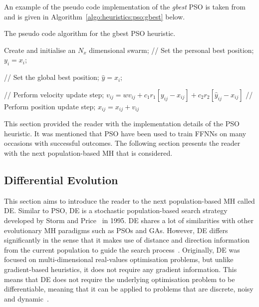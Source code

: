 An example of the pseudo code implementation of the \textit{gbest} \ac{PSO} is taken from~\cite{ref:engelbrecht:2007} and is given in Algorithm~\ref{algo:heuristics:pso:gbest} below.

\begin{algorithm}[H]
      \caption{The pseudo code algorithm for the gbest \ac{PSO} heuristic.}
      \label{algo:heuristics:pso:gbest}
      \begin{algorithmic}
            \State Create and initialise an $N_{x}$ dimensional swarm;
            \State // Set the personal best position;
            \State $y_{i} = x_{i}$;
            \EndIf

            \State // Set the global best position;
            \State $\hat{y} = x_{i}$;
            \EndIf
            \EndFor

            \State // Perform velocity update step;
            \State $v_{ij} = wv_{ij} + c_{1}r_{1}[y_{ij} - x_{ij}] + c_{2}r_{2}[\hat{y}_{ij} - x_{ij}]$
            \State // Perform position update step;
            \State $x_{ij} = x_{ij} + v_{ij}$
            \EndFor
            \EndWhile
      \end{algorithmic}
\end{algorithm}

This section provided the reader with the implementation details of the \acs{PSO} heuristic. It was mentioned that \ac{PSO} have been used to train \acp{FFNN} on many occasions with successful outcomes. The following section presents the reader with the next population-based \ac{MH} that is considered.

\subsection{Differential Evolution}
\label{sec:heuristics:mh:de}

This section aims to introduce the reader to the next population-based \ac{MH} called \acl{DE}. Similar to \ac{PSO}, \Ac{DE} is a stochastic population-based search strategy developed by Storm and Price~\cite{ref:price:2006} in 1995. \Ac{DE} shares a lot of similarities with other evolutionary \ac{MH} paradigms such as \acp{PSO} and \acp{GA}. However, \ac{DE} differs significantly in the sense that it makes use of distance and direction information from the current population to guide the search process~\cite{ref:engelbrecht:2007}. Originally, \ac{DE} was focused on multi-dimensional real-values optimisation problems, but unlike gradient-based heuristics, it does not require any gradient information. This means that \ac{DE} does not require the underlying optimisation problem to be differentiable, meaning that it can be applied to problems that are discrete, noisy and dynamic~\cite{ref:rocca:2011}.

